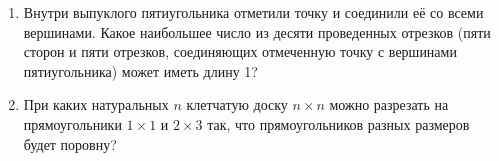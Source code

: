 \documentclass{article}
\begin{document}
\begin{enumerate}[label*=\protect\fbox{\arabic{enumi}}]
\item Внутри выпуклого пятиугольника отметили точку и соединили её со всеми вершинами. Какое наибольшее число из десяти проведенных отрезков (пяти сторон и пяти отрезков, соединяющих отмеченную точку с вершинами пятиугольника) может иметь длину 1?

\item При каких натуральных $n$ клетчатую доску $n \times n$ можно разрезать на прямоугольники $1 \times 1$ и $2 \times 3$ так, что прямоугольников разных размеров будет поровну?

\end{enumerate}
\end{document}
